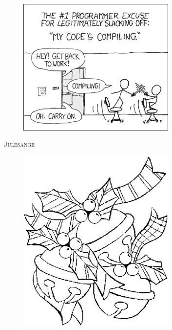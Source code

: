 \newpage

\newpage

\begin{figure}[hb!]
  \centering
    \includegraphics[width=0.7\textwidth]{images/compiling.eps}
\end{figure}
\newpage

\newpage


\newpage

\newpage

\newpage


\newpage

\newpage

\begin{center}
{\Huge\textsc{Julesange}}
\end{center}
\begin{figure}[h!]
  \centering
    \includegraphics[width=0.7\textwidth]{images/jule.eps}
\end{figure}
\newpage

\newpage

\newpage

\newpage

\newpage


\newpage

\newpage

\newpage

